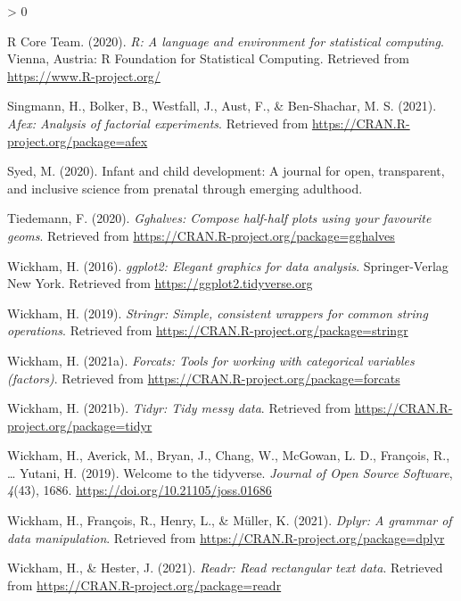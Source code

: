 \documentclass[
  english,
  man]{apa6}
\newlength{\cslhangindent}
\newenvironment{CSLReferences}[2] %
 {%
  \setlength{\parindent}{0pt}
  \ifodd #1 \everypar{\setlength{\hangindent}{\cslhangindent}}\ignorespaces\fi
  \ifnum #2 > 0
  \setlength{\parskip}{#2\baselineskip}
  \fi
 }%
 {}
\begin{document}
\begin{CSLReferences}{1}{0}
\leavevmode\hypertarget{ref-R-base}{}%
R Core Team. (2020). \emph{R: A language and environment for statistical computing}. Vienna, Austria: R Foundation for Statistical Computing. Retrieved from \url{https://www.R-project.org/}

\leavevmode\hypertarget{ref-R-afex}{}%
Singmann, H., Bolker, B., Westfall, J., Aust, F., \& Ben-Shachar, M. S. (2021). \emph{Afex: Analysis of factorial experiments}. Retrieved from \url{https://CRAN.R-project.org/package=afex}

\leavevmode\hypertarget{ref-syed2020infant}{}%
Syed, M. (2020). Infant and child development: A journal for open, transparent, and inclusive science from prenatal through emerging adulthood.

\leavevmode\hypertarget{ref-R-gghalves}{}%
Tiedemann, F. (2020). \emph{Gghalves: Compose half-half plots using your favourite geoms}. Retrieved from \url{https://CRAN.R-project.org/package=gghalves}

\leavevmode\hypertarget{ref-R-ggplot2}{}%
Wickham, H. (2016). \emph{ggplot2: Elegant graphics for data analysis}. Springer-Verlag New York. Retrieved from \url{https://ggplot2.tidyverse.org}

\leavevmode\hypertarget{ref-R-stringr}{}%
Wickham, H. (2019). \emph{Stringr: Simple, consistent wrappers for common string operations}. Retrieved from \url{https://CRAN.R-project.org/package=stringr}

\leavevmode\hypertarget{ref-R-forcats}{}%
Wickham, H. (2021a). \emph{Forcats: Tools for working with categorical variables (factors)}. Retrieved from \url{https://CRAN.R-project.org/package=forcats}

\leavevmode\hypertarget{ref-R-tidyr}{}%
Wickham, H. (2021b). \emph{Tidyr: Tidy messy data}. Retrieved from \url{https://CRAN.R-project.org/package=tidyr}

\leavevmode\hypertarget{ref-R-tidyverse}{}%
Wickham, H., Averick, M., Bryan, J., Chang, W., McGowan, L. D., François, R., \ldots{} Yutani, H. (2019). Welcome to the {tidyverse}. \emph{Journal of Open Source Software}, \emph{4}(43), 1686. \url{https://doi.org/10.21105/joss.01686}

\leavevmode\hypertarget{ref-R-dplyr}{}%
Wickham, H., François, R., Henry, L., \& Müller, K. (2021). \emph{Dplyr: A grammar of data manipulation}. Retrieved from \url{https://CRAN.R-project.org/package=dplyr}

\leavevmode\hypertarget{ref-R-readr}{}%
Wickham, H., \& Hester, J. (2021). \emph{Readr: Read rectangular text data}. Retrieved from \url{https://CRAN.R-project.org/package=readr}

\end{CSLReferences}

\endgroup
\end{document}
